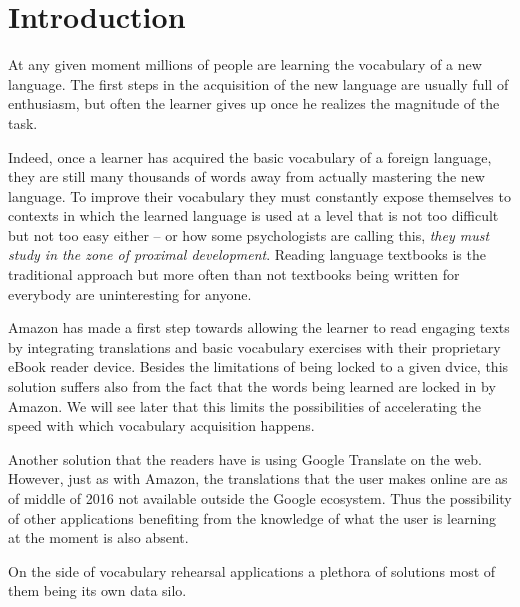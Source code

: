 \documentclass{sig-alternate-05-2015}
\begin{document}
\newcommand{\Lesson}[1]{ \vspace {0.3cm} \hrule \vspace{0.2cm} {\bf #1} \vspace{0.2cm} \hrule \vspace{0.3cm}}


\section{Introduction}

At any given moment millions of people are learning the vocabulary of a new language. The first steps in the acquisition of the new language are usually full of enthusiasm, but often the learner gives up once he realizes the magnitude of the task.

Indeed, once a learner has acquired the basic vocabulary of a foreign language, they are still many thousands of words away from actually mastering the new language. To improve their vocabulary they must constantly expose themselves to contexts in which the learned language is used at a level that is not too difficult but not too easy either -- or how some psychologists are calling this, {\em they must study in the zone of proximal development}. Reading language textbooks is the traditional approach but more often than not textbooks being written for everybody are uninteresting for anyone.

Amazon has made a first step towards allowing the learner to read engaging texts by integrating translations and basic vocabulary exercises with their proprietary eBook reader device. Besides the limitations of being locked to a given dvice, this solution suffers also from the fact that the words being learned are locked in by Amazon. We will see later that this limits the possibilities of accelerating the speed with which vocabulary acquisition happens.

Another solution that the readers have is using Google Translate on the web. However, just as with Amazon, the translations that the user makes online are as of middle of 2016 not available outside the Google ecosystem. Thus the possibility of other applications benefiting from the knowledge of what the user is learning at the moment is also absent.

On the side of vocabulary rehearsal applications a plethora of solutions most of them being its own data silo. 
\end{document}
